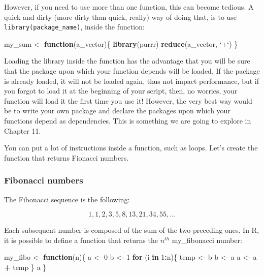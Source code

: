 \documentclass[]{gitbook}
\newenvironment{Shaded}{\begin{snugshade}}{\end{snugshade}}
\newcommand{\ControlFlowTok}[1]{\textcolor[rgb]{0.13,0.29,0.53}{\textbf{#1}}}
\newcommand{\DataTypeTok}[1]{\textcolor[rgb]{0.13,0.29,0.53}{#1}}
\newcommand{\DecValTok}[1]{\textcolor[rgb]{0.00,0.00,0.81}{#1}}
\newcommand{\KeywordTok}[1]{\textcolor[rgb]{0.13,0.29,0.53}{\textbf{#1}}}
\newcommand{\NormalTok}[1]{#1}
\newcommand{\OperatorTok}[1]{\textcolor[rgb]{0.81,0.36,0.00}{\textbf{#1}}}
\newcommand{\StringTok}[1]{\textcolor[rgb]{0.31,0.60,0.02}{#1}}
\begin{document}
However, if you need to use more than one function, this can become tedious. A quick and dirty
(more dirty than quick, really) way of doing that, is to use \texttt{library(package\_name)}, inside the function:

\begin{Shaded}
\begin{Highlighting}[]
\NormalTok{my_sum <-}\StringTok{ }\ControlFlowTok{function}\NormalTok{(a_vector)\{}
  \KeywordTok{library}\NormalTok{(purrr)}
  \KeywordTok{reduce}\NormalTok{(a_vector, }\StringTok{`}\DataTypeTok{+}\StringTok{`}\NormalTok{)}
\NormalTok{\}}
\end{Highlighting}
\end{Shaded}

Loading the library inside the function has the advantage that you will be sure that the package
upon which your function depends will be loaded. If the package is already loaded, it will not be
loaded again, thus not impact performance, but if you forgot to load it at the beginning of your
script, then, no worries, your function will load it the first time you use it! However, the very
best way would be to write your own package and declare the packages upon which your functions
depend as dependencies. This is something we are going to explore in Chapter 11.

You can put a lot of instructions inside a function, such as loops. Let's create the function that
returns Fionacci numbers.

\hypertarget{fibonacci-numbers}{%
\subsubsection{Fibonacci numbers}\label{fibonacci-numbers}}

The Fibonacci sequence is the following:

\[1, 1, 2, 3, 5, 8, 13, 21, 34, 55, ...\]

Each subsequent number is composed of the sum of the two preceding ones. In R, it is possible to define a function that returns the \(n^{th}\) my\_fibonacci number:

\begin{Shaded}
\begin{Highlighting}[]
\NormalTok{my_fibo <-}\StringTok{ }\ControlFlowTok{function}\NormalTok{(n)\{}
\NormalTok{ a <-}\StringTok{ }\DecValTok{0}
\NormalTok{ b <-}\StringTok{ }\DecValTok{1}
 \ControlFlowTok{for}\NormalTok{ (i }\ControlFlowTok{in} \DecValTok{1}\OperatorTok{:}\NormalTok{n)\{}
\NormalTok{  temp <-}\StringTok{ }\NormalTok{b}
\NormalTok{  b <-}\StringTok{ }\NormalTok{a}
\NormalTok{  a <-}\StringTok{ }\NormalTok{a }\OperatorTok{+}\StringTok{ }\NormalTok{temp}
\NormalTok{ \}}
\NormalTok{ a}
\NormalTok{\}}
\end{Highlighting}
\end{Shaded}
\end{document}
